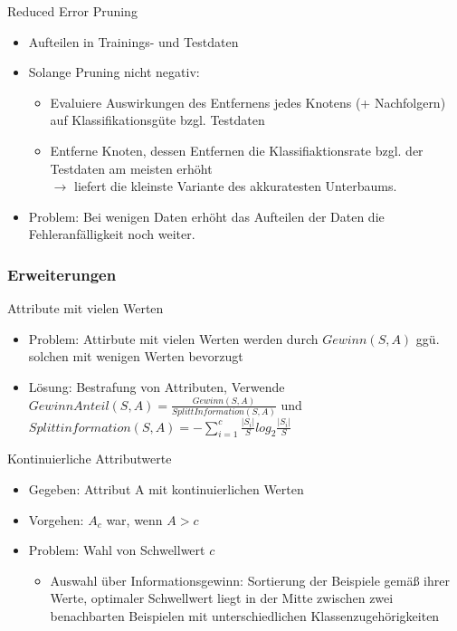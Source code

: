 \documentclass[paper=a4, fontsize=11pt]{scrartcl} %
\numberwithin{equation}{section} %
\numberwithin{figure}{section} %
\numberwithin{table}{section} %
\begin{document}
Reduced Error Pruning
\begin{itemize}
\item Aufteilen in Trainings- und Testdaten
\item Solange Pruning nicht negativ:
\begin{itemize}
\item Evaluiere Auswirkungen des Entfernens jedes Knotens (+ Nachfolgern) auf Klassifikationsgüte bzgl. Testdaten
\item Entferne Knoten, dessen Entfernen die Klassifiaktionsrate bzgl. der Testdaten am meisten erhöht\\ 
$\rightarrow$ liefert die kleinste Variante des akkuratesten Unterbaums.
\end{itemize}
\item Problem: Bei wenigen Daten erhöht das Aufteilen der Daten die Fehleranfälligkeit noch weiter.
\end{itemize}

\subsubsection{Erweiterungen}

Attribute mit vielen Werten
\begin{itemize}
\item Problem: Attirbute mit vielen Werten werden durch $Gewinn(S,A)$ ggü. solchen mit wenigen Werten bevorzugt
\item Lösung: Bestrafung von Attributen, Verwende $GewinnAnteil(S,A) = \frac{Gewinn(S,A)}{SplittInformation(S,A)}$ und $Splittinformation(S,A) = - \sum\limits_{i=1}^{c} \frac{|S_i|}{S} log_2 \frac{|S_i|}{S}$
\end{itemize}

Kontinuierliche Attributwerte
\begin{itemize}
\item Gegeben: Attribut A mit kontinuierlichen Werten
\item Vorgehen: $A_c$ war, wenn $A > c$
\item Problem: Wahl von Schwellwert $c$
\begin{itemize}
\item Auswahl über Informationsgewinn: Sortierung der Beispiele gemäß ihrer Werte, optimaler Schwellwert liegt in der Mitte zwischen zwei benachbarten Beispielen mit unterschiedlichen Klassenzugehörigkeiten
\end{itemize}
\end{itemize}
\end{document}
